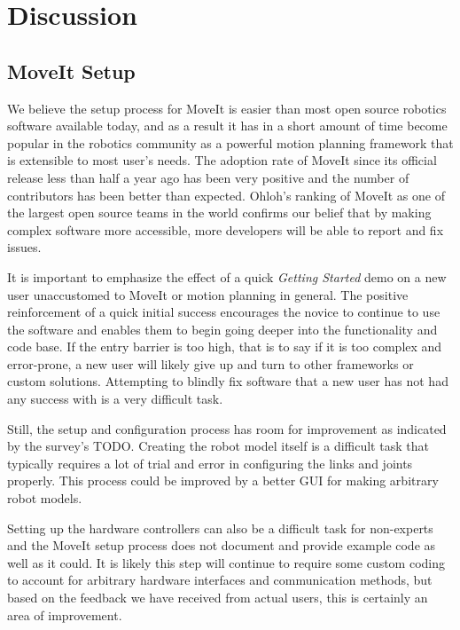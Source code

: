\documentclass[10pt,journal,compsoc]{joser1}
\begin{document}
{\section{Discussion}
\label{sec::discussion}

\subsection{MoveIt Setup}
\label{sec::moveit_discussion}

We believe the setup process for MoveIt is easier than most open source robotics software available today, and as a result it has in a short amount of time become popular in the robotics community as a powerful motion planning framework that is extensible to most user's needs. The adoption rate of MoveIt since its official release less than half a year ago has been very positive and the number of contributors has been better than expected. Ohloh's ranking of MoveIt as one of the largest open source teams in the world confirms our belief that by making complex software more accessible, more developers will be able to report and fix issues. 

It is important to emphasize the effect of a quick \textit{Getting Started} demo on a new user unaccustomed to MoveIt or motion planning in general. The positive reinforcement of a quick initial success encourages the novice to continue to use the software and enables them to begin going deeper into the functionality and code base. If the entry barrier is too high, that is to say if it is too complex and error-prone, a new user will likely give up and turn to other frameworks or custom solutions. Attempting to blindly fix software that a new user has not had any success with is a very difficult task.

Still, the setup and configuration process has room for improvement as indicated by the survey's TODO. Creating the robot model itself is a difficult task that typically requires a lot of trial and error in configuring the links and joints properly. This process could be improved by a better GUI for making arbitrary robot models. 

Setting up the hardware controllers can also be a difficult task for non-experts and the MoveIt setup process does not document and provide example code as well as it could. It is likely this step will continue to require some custom coding to account for arbitrary hardware interfaces and communication methods, but based on the feedback we have received from actual users, this is certainly an area of improvement. 

}
\end{document}
